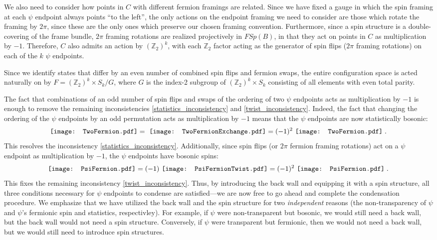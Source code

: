 \documentclass[12pt,a4paper]{article}
\newcommand{\zt}{\mathbb{Z}_2}
\newcommand{\PsiFermion}{\mathord{\vcenter{\hbox{\texttt{[image: PsiFermion.pdf]}}}}}
\newcommand{\PsiFermionTwist}{\mathord{\vcenter{\hbox{\texttt{[image: PsiFermionTwist.pdf]}}}}}
\newcommand{\TwoFermion}{\mathord{\vcenter{\hbox{\texttt{[image: TwoFermion.pdf]}}}}}
\newcommand{\TwoFermionExchange}{\mathord{\vcenter{\hbox{\texttt{[image: TwoFermionExchange.pdf]}}}}}
\begin{document}
We also need to consider how points in $C$ with different fermion framings are related. 
Since we have fixed a gauge in which the spin framing at each $\psi$ endpoint always points ``to the left'', the only actions on the endpoint framing we need to consider are those which rotate the framing by $2\pi$, since these are the only ones which preserve our chosen framing convention. 
Furthermore, since a spin structure is a double-covering of the frame bundle, $2\pi$ framing rotations are realized projectively in $FSp(B)$, in that they act on points in $C$ as multiplication by $-1$. 
Therefore, $C$ also admits an action by $(\zt)^k$, with each $\zt$ factor acting as the generator of spin flips ($2\pi$ framing rotations) on each of the $k$ $\psi$ endpoints.

Since we identify states that differ by an even number of combined spin flips and fermion swaps, the entire configuration space is acted naturally on by $F = (\zt)^k\times S_k / G$, 
where $G$ is the index-2 subgroup of $(\zt)^k\times S_k$ consisting of all elements with even total parity.

The fact that combinations of an odd number of spin flips and swaps of the ordering of two $\psi$ endpoints acts as multiplication by $-1$ is enough to remove the remaining inconsistencies \eqref{statistics_inconsistency} and \eqref{twist_inconsistency}.
Indeed, the fact that changing the ordering of the $\psi$ endpoints by an odd permutation acts as multiplication by $-1$ means that the $\psi$ endpoints are now statistically bosonic:
\begin{align} \label{boxbraidxxx}
\TwoFermion =\ \TwoFermionExchange = (-1)^2\ \TwoFermion\;.
\end{align}
This resolves the inconsistency \eqref{statistics_inconsistency}. Additionally, since spin flips (or $2\pi$ fermion framing rotations) act on a $\psi$ endpoint as multiplication by $-1$, 
the $\psi$ endpoints have bosonic spins:
\begin{align} \label{boxspinxxx}
\PsiFermion = (-1)\ \PsiFermionTwist = (-1)^2\ \PsiFermion\;. 
\end{align}
This fixes the remaining inconsistency \eqref{twist_inconsistency}. 
Thus, by introducing the back wall and equipping it with a spin structure, all three conditions necessary for $\psi$ endpoints to condense are satisfied---we are now free to go ahead and complete the condensation procedure. 
We emphasize that we have utilized the back wall and the spin structure for two {\it independent} reasons (the non-transparency of $\psi$ and $\psi$'s fermionic spin and statistics, respectivley). 
For example, if $\psi$ were non-transparent but bosonic, we would still need a back wall, but the back wall would not need a spin structure.
Conversely, if $\psi$ were transparent but fermionic, then we would not need a back wall, but we would still need to introduce spin
structures.
\end{document}
